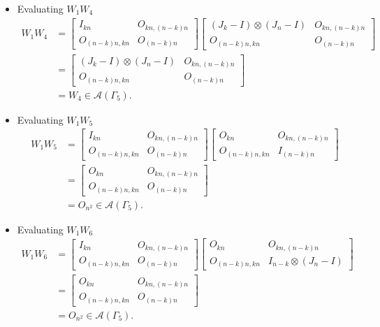 \begin{itemize}
\item Evaluating $W_{1}W_{4}$
\begin{align*}
W_1W_4 &=
\begin{bmatrix}
I_{kn} & O_{kn, (n-k)n} \\
O_{(n-k)n,kn} & O_{(n-k)n}
\end{bmatrix}\begin{bmatrix}
(J_k - I) \otimes (J_n-I) & O_{kn, (n-k)n} \\
O_{(n-k)n,kn} & O_{(n-k)n}
\end{bmatrix}\\
&= \begin{bmatrix}
(J_k - I) \otimes (J_n-I) & O_{kn, (n-k)n} \\
O_{(n-k)n,kn} & O_{(n-k)n}
\end{bmatrix}\\
&= W_4 \in\mathcal{A}(\Gamma_5).
\end{align*}

\item Evaluating $W_{1}W_{5}$
\begin{align*}
W_1W_5 &=
\begin{bmatrix}
I_{kn} & O_{kn, (n-k)n} \\
O_{(n-k)n,kn} & O_{(n-k)n}
\end{bmatrix}\begin{bmatrix}
O_{kn} & O_{kn, (n-k)n} \\
O_{(n-k)n,kn} & I_{(n - k)n}
\end{bmatrix}\\
&= \begin{bmatrix}
O_{kn} & O_{kn, (n-k)n} \\
O_{(n-k)n,kn} & O_{(n - k)n}
\end{bmatrix}\\
&= O_{n^2} \in\mathcal{A}(\Gamma_5).
\end{align*}

\item Evaluating $W_{1}W_{6}$
\begin{align*}
W_1W_6 &=
\begin{bmatrix}
I_{kn} & O_{kn, (n-k)n} \\
O_{(n-k)n,kn} & O_{(n-k)n}
\end{bmatrix}\begin{bmatrix}
O_{kn} & O_{kn, (n-k)n} \\
O_{(n-k)n,kn} & I_{n - k} \otimes (J_n - I)
\end{bmatrix}\\
&= \begin{bmatrix}
O_{kn} & O_{kn, (n-k)n} \\
O_{(n-k)n,kn} & O_{(n - k)n}
\end{bmatrix}\\
&= O_{n^2} \in\mathcal{A}(\Gamma_5).
\end{align*}


\end{itemize}
